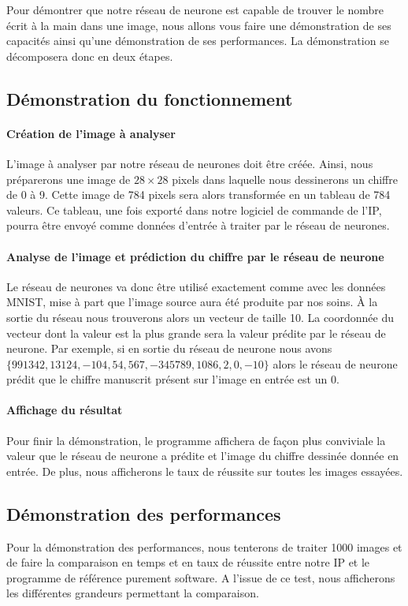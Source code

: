 Pour démontrer que notre réseau de neurone est capable de trouver le nombre écrit à la main 
dans une image, nous allons vous faire une démonstration de ses capacités ainsi
qu'une démonstration de ses performances. 
La démonstration se décomposera donc en deux étapes.

\subsection{Démonstration du fonctionnement}

\paragraph{Création de l'image à analyser\\}
	L'image à analyser par notre réseau de neurones doit être créée. Ainsi, nous préparerons 
	une image de $28 \times 28$ pixels dans laquelle nous dessinerons un chiffre de 0 à 9. 
	Cette image de 784 pixels sera alors transformée en un tableau de 784 valeurs. 
	Ce tableau, une fois exporté dans notre logiciel de commande de l'IP, 
	pourra être envoyé comme données d'entrée à traiter par le réseau de neurones.
	
\paragraph{Analyse de l'image et prédiction du chiffre par le réseau de neurone\\}
	Le réseau de neurones va donc être utilisé exactement comme avec les données MNIST\cite{lecun2010mnist}, 
	mise à part que l'image source aura été produite par nos soins. \`{A} la sortie du réseau 
	nous trouverons alors un vecteur de taille 10. La coordonnée du vecteur dont la 
	valeur est la plus grande sera la valeur prédite par le réseau de neurone. 
	Par exemple, si en sortie du réseau de neurone nous avons $\{991342, 13124, -104, 54, 567, -345789, 1086, 2, 0, -10\}$ 
	alors le réseau de neurone prédit que le chiffre manuscrit présent sur l'image en entrée est un 0.
	
\paragraph{Affichage du résultat\\}
	Pour finir la démonstration, le programme affichera de façon plus conviviale 
	la valeur que le réseau de neurone a prédite et l'image du chiffre dessinée donnée en entrée. 
	De plus, nous afficherons le taux de réussite sur toutes les images essayées.
	
\subsection{Démonstration des performances}
	Pour la démonstration des performances, nous tenterons de traiter 1000 images 
	et de faire la comparaison en temps et en taux de réussite entre notre IP 
	et le programme de référence purement software. A l'issue de ce test, nous afficherons les 
	différentes grandeurs permettant la comparaison.
